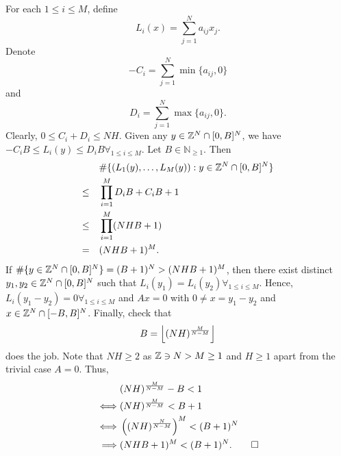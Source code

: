 \documentclass{Vorlesungstemplate_English} %
\renewcommand{\N}{\mathbb{N}_{\geq 1}}
\begin{document}
\begin{pf}
  For each $1 \leq i \leq M$, define \[L_i(x) = \sum_{j=1}^N a_{ij}x_j.\] Denote
  \[ -C_i = \sum_{j=1}^N \min\{a_{ij},0\}\]
  and
  \[ D_i = \sum_{j=1}^N \max\{ a_{ij}, 0\}.\]
  Clearly, $0 \leq C_i+D_i \leq NH$. Given any $y \in \mathbb{Z}^N \cap [0,B]^N$, we have $-C_iB \leq L_i(y) \leq D_iB \forall_{1 \leq i \leq M}$. Let $B \in \N$. Then
  \begin{align*} & \#\{ (L_1(y), \dots, L_M(y)): y \in \mathbb{Z}^N \cap [0,B]^N\} \\
  \leq \quad & \prod_{i=1}^M D_iB+C_iB+1 \\
  \leq \quad & \prod_{i=1}^M (NHB+1) \\
  = \quad & (NHB+1)^M.\end{align*}
  If $\#\{ y \in \mathbb{Z}^N \cap [0,B]^N\} = (B+1)^N > (NHB+1)^M$, then there exist distinct $y_1, y_2 \in \mathbb{Z}^N \cap [0,B]^N$ such that $L_i(y_1) = L_i(y_2) \forall_{1 \leq i \leq M}$. Hence, $L_i(y_1-y_2) = 0 \forall_{1 \leq i \leq M}$ and $Ax = 0$ with $0 \neq x= y_1-y_2$ and $x \in \mathbb{Z}^N \cap [-B,B]^N$. Finally, check that \[ B = \left\lfloor (NH)^{\frac{M}{N-M}}\right\rfloor\]
  does the job.
  {\color{blue} Note that $NH \geq 2$ as $\mathbb{Z} \ni N > M \geq 1$ and $H \geq 1$ apart from the trivial case $A = 0$. Thus,
  \begin{align*}
    & (NH)^{\frac{M}{N-M}}-B < 1 \\
    \iff & (NH)^{\frac{M}{N-M}} < B+1 \\
    \iff & \left((NH)^{\frac{N}{N-M}}\right)^M < (B+1)^N \\
    \implies & (NHB + 1)^M < (B+1)^N. \qedhere
  \end{align*}}
\end{pf}
\end{document}
